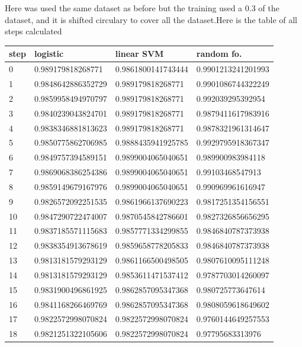 Here was used the same dataset as before but the training used a 0.3 of the dataset, and it is shifted circulary to cover all the dataset.Here is the table of all steps calculated \\
\begin{longtable} 
{|l |l |l |l |} 
\hline 
step  &logistic  &linear SVM  &random fo.  \\ \hline
0  &0.989179818268771  &0.9861800141743444  &0.9901213241201993  \\ \hline
1  &0.9848642886352729  &0.989179818268771  &0.9901086744322249  \\ \hline
2  &0.9859958494970797  &0.989179818268771  &0.992039295392954  \\ \hline
3  &0.9840239043824701  &0.989179818268771  &0.9879411617983916  \\ \hline
4  &0.9838346881813623  &0.989179818268771  &0.9878321961314647  \\ \hline
5  &0.9850775862706985  &0.9888435941925785  &0.9929795918367347  \\ \hline
6  &0.9849757394589151  &0.9899004065040651  &0.989900983984118  \\ \hline
7  &0.9869068386254386  &0.9899004065040651  &0.99103468547913  \\ \hline
8  &0.9859149679167976  &0.9899004065040651  &0.990969961616947  \\ \hline
9  &0.9826572092251535  &0.9861966137690223  &0.9817251354156551  \\ \hline
10  &0.9847290722474007  &0.9870545842786601  &0.9827326856656295  \\ \hline
11  &0.9837185571115683  &0.9857771334299855  &0.9846840787373938  \\ \hline
12  &0.9838354913678619  &0.9859658778205833  &0.9846840787373938  \\ \hline
13  &0.9813181579293129  &0.9861166500498505  &0.9807610095111248  \\ \hline
14  &0.9813181579293129  &0.9853611471537412  &0.9787703014260097  \\ \hline
15  &0.9831900496861925  &0.9862857095347368  &0.980725773647614  \\ \hline
16  &0.9841168266469769  &0.9862857095347368  &0.9808059618649602  \\ \hline
17  &0.9822572998070824  &0.9822572998070824  &0.9760144649257553  \\ \hline
18  &0.9821251322105606  &0.9822572998070824  &0.97795683313976  \\ \hline

\end{longtable}
